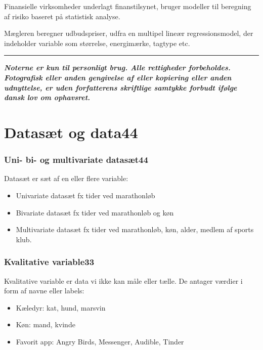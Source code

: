 \documentclass[]{book}
\providecommand{\tightlist}{%
  \setlength{\itemsep}{0pt}\setlength{\parskip}{0pt}}
\theoremstyle{definition}
\theoremstyle{definition}
\theoremstyle{definition}
\theoremstyle{remark}
\begin{document}
Finansielle virksomheder underlagt finanstilsynet, bruger modeller til
beregning af risiko baseret på statistisk analyse.

Mægleren beregner udbudspriser, udfra en multipel lineær
regressionsmodel, der indeholder variable som størrelse, energimærke,
tagtype etc.

\begin{center}\rule{0.5\linewidth}{\linethickness}\end{center}

\textbf{\emph{Noterne er kun til personligt brug. Alle rettigheder
forbeholdes. Fotografisk eller anden gengivelse af eller kopiering eller
anden udnyttelse, er uden forfatterens skriftlige samtykke forbudt
ifølge dansk lov om ophavsret.}}

\hypertarget{datast-og-data44}{%
\chapter{Datasæt og data44}\label{datast-og-data44}}

\hypertarget{uni--bi--og-multivariate-datast44}{%
\subsection{Uni- bi- og multivariate
datasæt44}\label{uni--bi--og-multivariate-datast44}}

Datasæt er sæt af en eller flere variable:

\begin{itemize}
\tightlist
\item
  Univariate datasæt fx tider ved marathonløb\\
\item
  Bivariate datasæt fx tider ved marathonløb og køn
\item
  Multivariate datasæt fx tider ved marathonløb, køn, alder, medlem af
  sports klub.
\end{itemize}

\hypertarget{kvalitative-variable33}{%
\subsection{Kvalitative variable33}\label{kvalitative-variable33}}

Kvalitative variable er data vi ikke kan måle eller tælle. De antager
værdier i form af navne eller labels:

\begin{itemize}
\tightlist
\item
  Kæledyr: kat, hund, marsvin
\item
  Køn: mand, kvinde
\item
  Favorit app: Angry Birds, Messenger, Audible, Tinder
\end{itemize}
\end{document}
